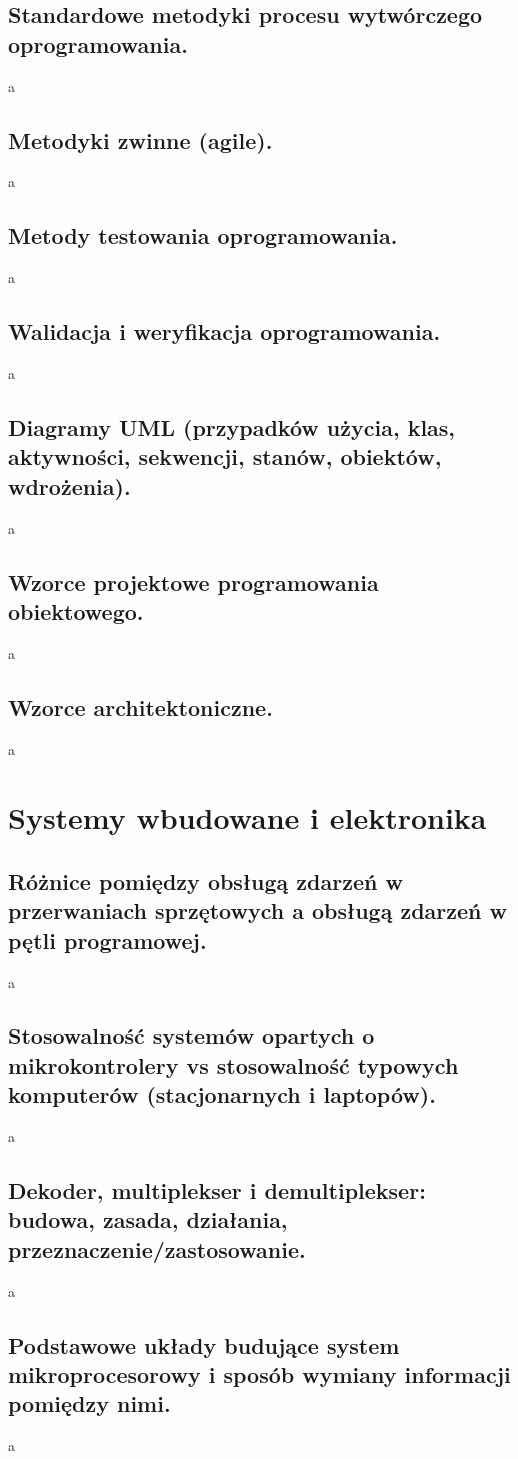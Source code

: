 \documentclass[a4paper,12pt,oneside]{book}
\begin{document}
			\subsection{\color{red}Standardowe metodyki procesu wytwórczego oprogramowania.}
				a
			\newpage\subsection{\color{red}Metodyki zwinne (agile).}
				a
			\newpage\subsection{\color{red}Metody testowania oprogramowania.}
				a
			\newpage\subsection{\color{red}Walidacja i weryfikacja oprogramowania.}
				a
			\newpage\subsection{\color{red}Diagramy UML (przypadków użycia, klas, aktywności, sekwencji, stanów, obiektów, wdrożenia).}
				a
			\newpage\subsection{\color{red}Wzorce projektowe programowania obiektowego.}
				a
			\newpage\subsection{\color{red}Wzorce architektoniczne.}
				a
		
		\newpage\section{Systemy wbudowane i elektronika}
			\subsection{\color{red}Różnice pomiędzy obsługą zdarzeń w przerwaniach sprzętowych a obsługą zdarzeń w pętli programowej.}
				a
			\newpage\subsection{\color{red}Stosowalność systemów opartych o mikrokontrolery vs stosowalność typowych komputerów (stacjonarnych i laptopów).}
				a
			\newpage\subsection{\color{red}Dekoder, multiplekser i demultiplekser: budowa, zasada, działania, przeznaczenie/zastosowanie.}
				a
			\newpage\subsection{\color{red}Podstawowe układy budujące system mikroprocesorowy i sposób wymiany informacji pomiędzy nimi.}
				a
\end{document}
